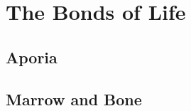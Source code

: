 
\chapter{The Bonds of Life} %
\label{cha:the_bonds_of_life}

\section{Aporia} %
\label{sec:aporia}




\section{Marrow and Bone} %
\label{sec:marrow_and_bone}






